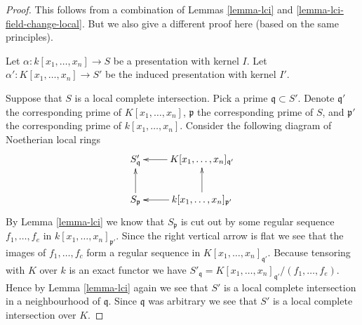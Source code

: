 \begin{proof}
This follows from a combination of Lemmas
\ref{lemma-lci} and \ref{lemma-lci-field-change-local}.
But we also give a different
proof here (based on the same principles).

\medskip\noindent
Let $\alpha : k[x_1, \ldots, x_n] \to S$ be a presentation
with kernel $I$. Let $\alpha' : K[x_1, \ldots, x_n] \to S'$
be the induced presentation with kernel $I'$.

\medskip\noindent
Suppose that $S$ is a local complete intersection.
Pick a prime $\mathfrak q \subset S'$. Denote
$\mathfrak q'$ the corresponding prime of $K[x_1, \ldots, x_n]$,
$\mathfrak p$ the corresponding prime of $S$, and
$\mathfrak p'$ the corresponding prime of $k[x_1, \ldots, x_n]$.
Consider the following diagram of Noetherian local rings
$$
\xymatrix{
S'_{\mathfrak q} &  K[x_1, \ldots, x_n]_{\mathfrak q'} \ar[l] \\
S_{\mathfrak p}\ar[u] &  k[x_1, \ldots, x_n]_{\mathfrak p'} \ar[u] \ar[l]
}
$$
By Lemma \ref{lemma-lci} we know that $S_{\mathfrak p}$
is cut out by some regular sequence $f_1, \ldots, f_e$ in
$k[x_1, \ldots, x_n]_{\mathfrak p'}$. Since the right vertical
arrow is flat we see that the images of $f_1, \ldots, f_c$
form a regular sequence in $K[x_1, \ldots, x_n]_{\mathfrak q'}$.
Because tensoring with $K$ over $k$ is an exact functor we have
$S'_{\mathfrak q} = K[x_1, \ldots, x_n]_{\mathfrak q'}/(f_1, \ldots, f_e)$.
Hence by Lemma \ref{lemma-lci} again we see that $S'$ is a local
complete intersection in a neighbourhood of $\mathfrak q$. Since
$\mathfrak q$ was arbitrary we see that $S'$ is a local complete
intersection over $K$.


\end{proof}
